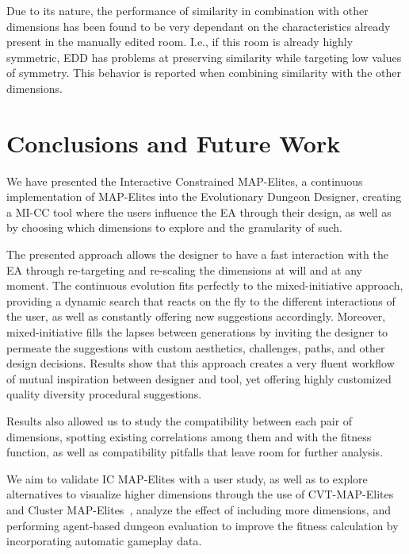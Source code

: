 \documentclass[conference]{IEEEtran}
\begin{document}
Due to its nature, the performance of similarity in combination with other dimensions has been found to be very dependant on the characteristics already present in the manually edited room. I.e., if this room is already highly symmetric, EDD has problems at preserving similarity while targeting low values of symmetry. This behavior is reported when combining similarity with the other dimensions.

\section{Conclusions and Future Work\label{section:conclusion}}
We have presented the Interactive Constrained MAP-Elites, a continuous implementation of MAP-Elites into the Evolutionary Dungeon Designer, creating a MI-CC tool where the users influence the EA through their design, as well as by choosing which dimensions to explore and the granularity of such. 

The presented approach allows the designer to have a fast interaction with the EA through re-targeting and re-scaling the dimensions at will and at any moment. The continuous evolution fits perfectly to the mixed-initiative approach, providing a dynamic search that reacts on the fly to the different interactions of the user, as well as constantly offering new suggestions accordingly. Moreover, mixed-initiative fills the lapses between generations by inviting the designer to permeate the suggestions with custom aesthetics, challenges, paths, and other design decisions. Results show that this approach creates a very fluent workflow of mutual inspiration between designer and tool, yet offering highly customized quality diversity procedural suggestions. 

Results also allowed us to study the compatibility between each pair of dimensions, spotting existing correlations among them and with the fitness function, as well as compatibility pitfalls that leave room for further analysis.

We aim to validate IC MAP-Elites with a user study, as well as to explore alternatives to visualize higher dimensions through the use of CVT-MAP-Elites~\cite{cvt-mape2016} and Cluster MAP-Elites~\cite{cluster-mape2017}, analyze the effect of including more dimensions, and performing agent-based dungeon evaluation to improve the fitness calculation by incorporating automatic gameplay data.




\vspace{12pt}
\end{document}
